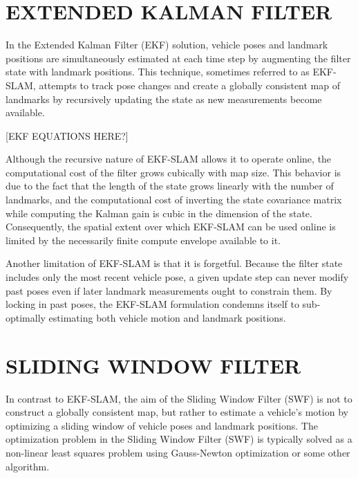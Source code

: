 \documentclass[letterpaper, 10 pt, conference]{ieeeconf}  %
\begin{document}
\section{EXTENDED KALMAN FILTER} \label{sec:ekf}
In the Extended Kalman Filter (EKF) solution, vehicle poses and landmark positions are simultaneously estimated at each time step by augmenting the filter state with landmark positions.
This technique, sometimes referred to as EKF-SLAM, attempts to track pose changes and create a globally consistent map of landmarks by recursively updating the state as new measurements become available.

[EKF EQUATIONS HERE?]

Although the recursive nature of EKF-SLAM allows it to operate online, the computational cost of the filter grows cubically with map size.
This behavior is due to the fact that the length of the state grows linearly with the number of landmarks, and the computational cost of inverting the state covariance matrix while computing the Kalman gain is cubic in the dimension of the state.
Consequently, the spatial extent over which EKF-SLAM can be used online is limited by the necessarily finite compute envelope available to it.

Another limitation of EKF-SLAM is that it is forgetful.
Because the filter state includes only the most recent vehicle pose, a given update step can never modify past poses even if later landmark measurements ought to constrain them.
By locking in past poses, the EKF-SLAM formulation condemns itself to sub-optimally estimating both vehicle motion and landmark positions.




\section{SLIDING WINDOW FILTER} \label{sec:slidingwindow}
In contrast to EKF-SLAM, the aim of the Sliding Window Filter (SWF) is not to construct a globally consistent map, but rather to estimate a vehicle's motion by optimizing a sliding window of vehicle poses and landmark positions.
The optimization problem in the Sliding Window Filter (SWF) is typically solved as a non-linear least squares problem using Gauss-Newton optimization or some other algorithm.
\end{document}

